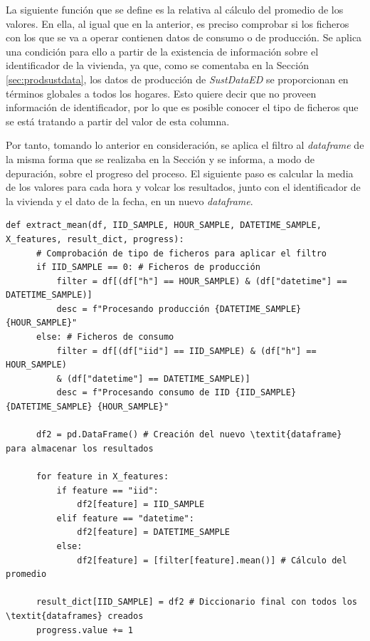 \vspace{3mm}

La siguiente función que se define es la relativa al cálculo del promedio de los valores. En ella, al igual que en la anterior, es preciso comprobar si los ficheros con los que se va a operar contienen datos de consumo o de producción. Se aplica una condición para ello a partir de la existencia de información sobre el identificador de la vivienda, ya que, como se comentaba en la Sección \ref{sec:prodsustdata}, los datos de producción de \textit{SustDataED} se proporcionan en términos globales a todos los hogares. Esto quiere decir que no proveen información de identificador, por lo que es posible conocer el tipo de ficheros que se está tratando a partir del valor de esta columna.

\vspace{3mm}

Por tanto, tomando lo anterior en consideración, se aplica el filtro al \textit{dataframe} de la misma forma que se realizaba en la Sección \label{sec:datasamples} y se informa, a modo de depuración, sobre el progreso del proceso. El siguiente paso es calcular la media de los valores para cada hora y volcar los resultados, junto con el identificador de la vivienda y el dato de la fecha, en un nuevo \textit{dataframe}.

\vspace{3mm}

\begin{lstlisting}[style=Python, caption={Función de cálculo del promedio}]
  def extract_mean(df, IID_SAMPLE, HOUR_SAMPLE, DATETIME_SAMPLE, X_features, result_dict, progress):
      # Comprobación de tipo de ficheros para aplicar el filtro
      if IID_SAMPLE == 0: # Ficheros de producción
          filter = df[(df["h"] == HOUR_SAMPLE) & (df["datetime"] == DATETIME_SAMPLE)]
          desc = f"Procesando producción {DATETIME_SAMPLE} {HOUR_SAMPLE}"
      else: # Ficheros de consumo
          filter = df[(df["iid"] == IID_SAMPLE) & (df["h"] == HOUR_SAMPLE) 
          & (df["datetime"] == DATETIME_SAMPLE)]
          desc = f"Procesando consumo de IID {IID_SAMPLE} {DATETIME_SAMPLE} {HOUR_SAMPLE}"

      df2 = pd.DataFrame() # Creación del nuevo \textit{dataframe} para almacenar los resultados

      for feature in X_features:
          if feature == "iid":
              df2[feature] = IID_SAMPLE
          elif feature == "datetime":
              df2[feature] = DATETIME_SAMPLE
          else:
              df2[feature] = [filter[feature].mean()] # Cálculo del promedio

      result_dict[IID_SAMPLE] = df2 # Diccionario final con todos los \textit{dataframes} creados
      progress.value += 1
\end{lstlisting}

